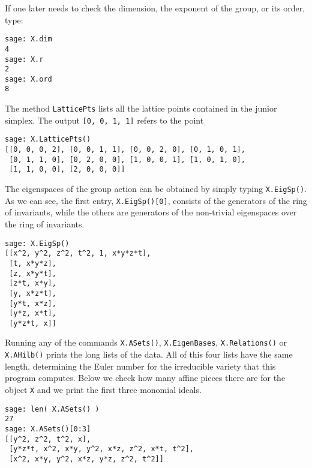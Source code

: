 \vspace{5pt}
\noindent If one later needs to check the dimension, the exponent  of the group, or its order, type:

\vspace{-20pt}
\singlespace
\begin{verbatim}
sage: X.dim
4
sage: X.r
2	
sage: X.ord
8
\end{verbatim}

\vspace{5pt}

\noindent The method \texttt{LatticePts} lists all the lattice points contained in the junior simplex. The output \texttt{[0, 0, 1, 1]} refers to the point 

\vspace{-20pt}
\singlespace
\begin{verbatim}
sage: X.LatticePts()
[[0, 0, 0, 2], [0, 0, 1, 1], [0, 0, 2, 0], [0, 1, 0, 1], 
 [0, 1, 1, 0], [0, 2, 0, 0], [1, 0, 0, 1], [1, 0, 1, 0],
 [1, 1, 0, 0], [2, 0, 0, 0]]
\end{verbatim}


\vspace{5pt}
\noindent The eigenspaces of the group action can be obtained by simply typing \texttt{X.EigSp()}. As we can see, the first entry, \texttt{X.EigSp()[0]}, consists of the generators of the ring of invariants, while the others are generators of the non-trivial eigenspaces over the ring of invariants.

\vspace{-20pt}
\singlespace
\begin{verbatim}
sage: X.EigSp()    
[[x^2, y^2, z^2, t^2, 1, x*y*z*t],
 [t, x*y*z],
 [z, x*y*t],
 [z*t, x*y],
 [y, x*z*t],
 [y*t, x*z],
 [y*z, x*t],
 [y*z*t, x]]
\end{verbatim}

\vspace{5pt}
\noindent 
 Running any of the commands \texttt{X.ASets()}, \texttt{X.EigenBases}, \texttt{X.Relations()} or \texttt{X.AHilb()} prints the long lists of the data. All of this four lists have the same length, determining the Euler number for the irreducible variety  that this program computes. Below we check how many affine pieces there are for the object \texttt{X} and we print the first three monomial ideals.


\vspace{-20pt}
\singlespace
\begin{verbatim}
sage: len( X.ASets() )
27
sage: X.ASets()[0:3]
[[y^2, z^2, t^2, x],
 [y*z*t, x^2, x*y, y^2, x*z, z^2, x*t, t^2],
 [x^2, x*y, y^2, x*z, y*z, z^2, t^2]]
\end{verbatim}


